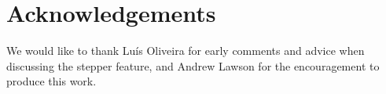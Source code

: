 \documentclass[sigconf]{acmart}
\begin{document}
\section{Acknowledgements}

We would like to thank Luís Oliveira for early comments and advice
when discussing the stepper feature, and Andrew Lawson for the
encouragement to produce this work.




\end{document}
